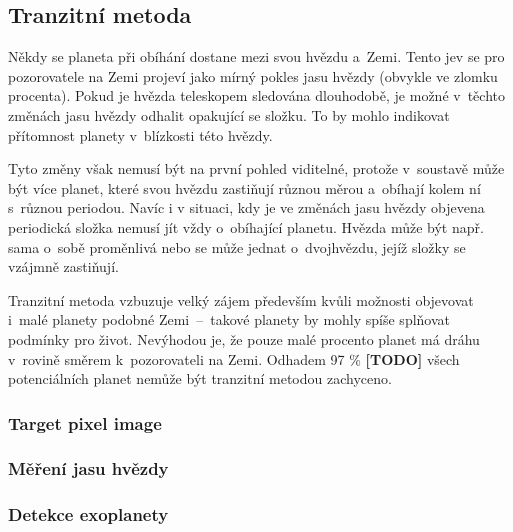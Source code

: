 \documentclass[a4paper,12pt]{article}
\begin{document}

\dataplot

\clearpage
\subsection{Tranzitní metoda}

Někdy se planeta při obíhání dostane mezi svou hvězdu a~Zemi. Tento jev se pro pozorovatele na Zemi projeví jako mírný pokles jasu hvězdy (obvykle ve zlomku procenta). Pokud je hvězda teleskopem sledována dlouhodobě, je možné v~těchto změnách jasu hvězdy odhalit opakující se složku. To by mohlo indikovat přítomnost planety v~blízkosti této hvězdy.

\drawgimp

Tyto změny však nemusí být na první pohled viditelné, protože v~soustavě může být více planet, které svou hvězdu zastiňují různou měrou a~obíhají kolem ní s~různou periodou. Navíc i v situaci, kdy je ve změnách jasu hvězdy objevena periodická složka nemusí jít vždy o~obíhající planetu. Hvězda může být např. sama o~sobě proměnlivá nebo se může jednat o~dvojhvězdu, jejíž složky se vzájmně zastiňují.

Tranzitní metoda vzbuzuje velký zájem především kvůli možnosti objevovat i~malé planety podobné Zemi~--~takové planety by mohly spíše splňovat podmínky pro život. Nevýhodou je, že pouze malé procento planet má dráhu v~rovině směrem k~pozorovateli na Zemi. Odhadem 97 \% \textbf{[TODO]} všech potenciálních planet nemůže být tranzitní metodou zachyceno.

\subsubsection{Target pixel image}

\subsubsection{Měření jasu hvězdy}


\subsubsection{Detekce exoplanety}
\end{document}
